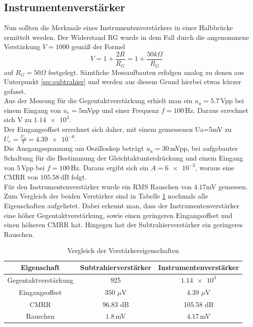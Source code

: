 \subsection{Instrumentenverstärker}
Nun sollten die Merkmale eines Instrumentenverstärkers in einer Halbbrücke ermittelt werden. Der Widerstand RG wurde in dem Fall durch die angenommene Verstärkung $V=1000$ gemäß der Formel
\begin{equation}
	V=1+\frac{2R}{R_G}=1+\frac{50k\Omega}{R_G} 
\end{equation} auf $R_G=50\Omega$ festgelegt.
Sämtliche Messaufbauten erfolgen analog zu denen aus Unterpunkt \ref{sec:subtrahier} und werden aus diesem Grund hierbei etwas kürzer gefasst. \\
Aus der Messung für die Gegentaktverstärkung erhielt man ein $u_a=5.7\,$Vpp bei einem Eingang von $u_e=5$mVpp und einer Frequenz $f=100\,$Hz. Daraus errechnet sich V zu $\num{1,14e+3}$.\\
Der Eingangsoffset errechnet sich daher, mit einem gemessenen Ua=5mV zu $U_e=\frac{U_a}{V}=\num{4.39e-6}$. \\
Die Ausgangsspannung am Oszilloskop beträgt $u_a=30\,$mVpp, bei aufgebauter Schaltung für die Bestimmung der Gleichtaktunterdrückung und einem Eingang von $5\,$Vpp bei $f=100\,$Hz. Daraus ergibt sich ein $A=\num{6e-3}$, woraus eine CMRR von $105.58\,$dB folgt. \\
Für den Instrumentenverstärker wurde ein RMS Rauschen von $4.17$mV gemessen. \\
Zum Vergleich der beiden Verstärker sind in Tabelle \ref{tb:eigenschaften} nochmals alle Eigenschaften aufgelistet. Dabei erkennt man, dass der Instrumentenverstärker eine höher Gegentaktverstärkung, sowie einen geringeren Eingangsoffset und einen höheren CMRR hat. Hingegen hat der Subtrahierverstärker ein geringeres Rauschen.
\begin{table}
	\begin{tabular}{|c|c|c|}
	\hline 
	Eigenschaft & Subtrahierverstärker & Instrumentenverstärker \\ 
	\hline 
	Gegentaktverstärkung & 925 & $\num{1.14e+3}$ \\ 
	\hline 
	Eingangsoffset & 350 $\mu$V & 4.39 $\mu$V \\ 
	\hline 
	CMRR & 96.83 dB & 105.58 dB \\ 
	\hline 
	Rauschen & $1.8\,$mV & $4.17\,$mV \\ 
	\hline 
	\end{tabular}
	\centering
	\caption{Vergleich der Verstärkereigenschaften}
	\label{tb:eigenschaften}
\end{table}

